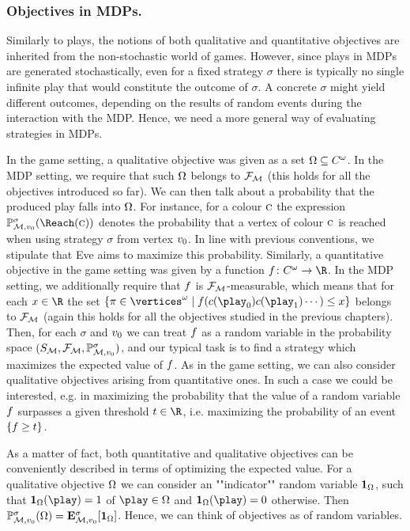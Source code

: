\subsubsection*{Objectives in MDPs.}

Similarly to plays, the notions of both qualitative and quantitative objectives 
are inherited from the non-stochastic world of games. However, since plays in 
MDPs are generated stochastically, even for a fixed strategy $\sigma$ there is 
typically no single infinite play that would constitute the outcome of 
$\sigma$. A concrete $\sigma$ might yield different outcomes, depending on the 
results of random events during the interaction with the MDP. Hence, we need a 
more general way of evaluating strategies in MDPs. 

In the game setting, a qualitative objective was given as a set $\Omega
\subseteq C^{\omega}$. In the MDP setting, we require that such 
$\Omega$ belongs to $\mathcal{F}_{\mathcal{M}}$ (this holds for all the objectives 
introduced so far). We can then talk about a 
probability that the produced play falls into $\Omega$. For instance, for a 
colour $\textsc{c}$ the expression 
$\probm^{\sigma}_{\mdp,\vinit}(\Reach(\genColour))$ 
denotes the probability that a vertex of colour $\textsc{c}$ is reached when 
using 
strategy $\sigma$ from vertex $v_0$. In line with previous conventions, we 
stipulate that Eve aims to maximize this probability. Similarly, a quantitative 
objective in the game setting was given by a function 
$\quantObj\colon \colours^\omega \rightarrow \R$. In the MDP setting, we 
additionally require that $f$ is $\mathcal{F}_{\mathcal{M}}$-measurable, which 
means that for each $x\in \R$ the set $\{\pi\in \vertices^\omega\mid 
\quantObj(\colouring(\play_0)\colouring(\play_1)\cdots) \leq x\}$ belongs to 
$\mathcal{F}_{\mathcal{M}}$ (again this holds for all the objectives studied 
in the previous chapters). Then, for each $\sigma$ and $v_0$ we can treat 
$f$ as a random variable 
in the probability space 
$(S_{\mathcal{M}},\mathcal{F}_{\mathcal{M}},\mathbb{P}^{\sigma}_{\mathcal{M},v_0})$, and our 
typical task is to find a strategy which maximizes the 
expected value of $f$. As in the game setting, we can also consider 
qualitative objectives arising from quantitative ones. In such a case we could 
be interested, e.g. in maximizing the probability that the value of a random 
variable $f$ surpasses a given threshold $t\in \R$, i.e. maximizing the 
probability of an event $\{f\geq t\}$.

As a matter of fact, both quantitative and qualitative objectives can be 
conveniently described in terms of optimizing the expected value. For a 
qualitative objective $\Omega$ we can consider an ""indicator"" random 
variable $\mathbf{1}_{\Omega}$, such that $\indicator{\objective}(\play)=1$ 
of 
$\play\in\Omega$ and $\indicator{\objective}(\play)=0$ otherwise. Then 
$\mathbb{P}^{\sigma}_{\mathcal{M},v_0}(\Omega) = 
\mathbf{E}^{\sigma}_{\mathcal{M},v_0}[\mathbf{1}_{\Omega}]$. Hence, we can think of 
objectives as of random variables.

